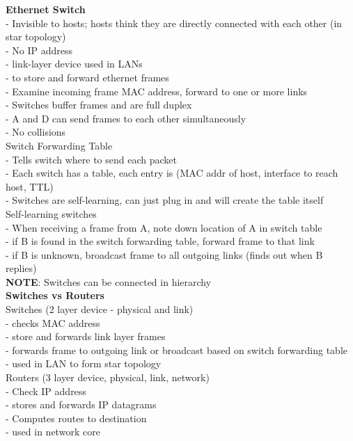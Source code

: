 \documentclass[10pt, a4paper]{article}
\newcommand{\highlight}[1]{{\color{red}\textbf{#1}}}
\newcommand{\red}[1]{{\color{red}#1}}
\newcommand{\green}[1]{{\color{ForestGreen}#1}}
\newcommand{\tab}[0]{\hspace*{2mm}}
\begin{document}
\begin{multicols*}{3}
		\textbf{Ethernet Switch}\\
		- \red{Invisible to hosts}; hosts think they are directly connected with each other (in star topology)\\
		\tab - No IP address\\
		- link-layer device used in LANs\\
		\tab - to store and forward ethernet frames\\
		\tab - Examine incoming frame MAC address, forward to one or more links\\
		- Switches buffer frames and are full duplex\\
		\tab - A and D can send frames to each other \red{simultaneously}\\
		- No collisions\\

		Switch Forwarding Table\\
		- Tells switch where to send each packet\\
		- Each switch has a table, each entry is (MAC addr of host, interface to reach host, TTL)\\
		- Switches are self-learning, can just plug in and will create the table itself\\

		Self-learning switches\\
		- When receiving a frame from A, note down location of A in switch table\\
		- if B is \green{found} in the switch forwarding table, forward frame to that link\\
		- if B is \red{unknown}, broadcast frame to \red{all outgoing links} (finds out when B replies)\\
		\highlight{NOTE}: Switches can be connected in hierarchy\\

		\textbf{Switches vs Routers}\\

		Switches (2 layer device - physical and link)\\
		- checks \red{MAC} address\\
		- store and forwards \red{link layer} frames\\
		- forwards frame to outgoing link or broadcast based on switch forwarding table\\
		- used in LAN to form star topology\\

		Routers (3 layer device, physical, link, network)\\
		- Check \red{IP} address\\
		- stores and forwards \red{IP} datagrams\\
		- Computes routes to destination\\
		- used in network core\\


\end{multicols*}
\end{document}
